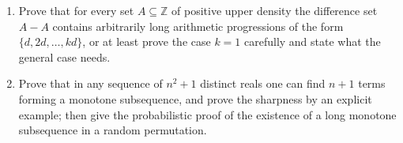 \documentclass[11pt,a4paper]{article}
\begin{document}
\begin{enumerate}[leftmargin=2.2em,itemsep=0.6em]
\item Prove that for every set $A\subseteq\mathbb Z$ of positive upper density the difference
set $A-A$ contains arbitrarily long arithmetic progressions of the form $\{d,2d,\dots,kd\}$, or
at least prove the case $k=1$ carefully and state what the general case needs.

\item Prove that in any sequence of $n^2+1$ distinct reals one can find $n+1$ terms forming a
monotone subsequence, and prove the sharpness by an explicit example; then give the
probabilistic proof of the existence of a long monotone subsequence in a random permutation.
\end{enumerate}
\end{document}
